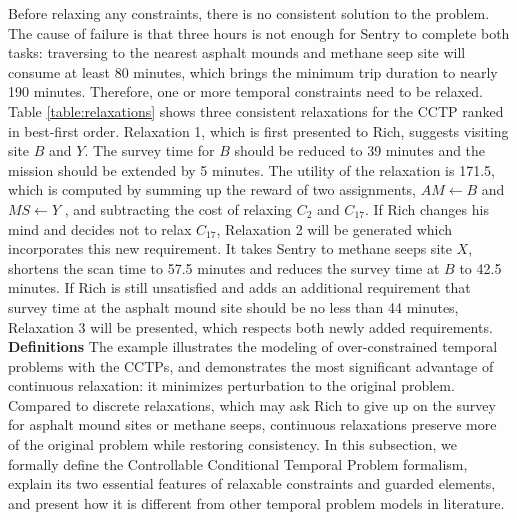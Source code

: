\documentclass[jair,twoside,11pt,theapa]{article}
\begin{document}
Before relaxing any constraints, there is no consistent solution to the problem.
The cause of failure is that three hours is not enough for Sentry to complete
both tasks: traversing to the nearest asphalt mounds and methane seep site
will consume at least 80 minutes, which brings the minimum trip duration to nearly 190
minutes. Therefore, one or more temporal constraints need to be relaxed. Table
\ref{table:relaxations} shows three consistent relaxations for the CCTP ranked
in best-first order. Relaxation 1, which is first presented to Rich, suggests
visiting site $B$ and $Y$. The survey time for $B$ should be reduced to 39
minutes and the mission should be extended by 5 minutes. The utility of the
relaxation is 171.5, which is computed by summing up the reward of two
assignments, $AM \leftarrow B$ and $MS \leftarrow Y$ , and subtracting the cost
of relaxing $C_2$ and $C_{17}$. If Rich changes his mind and decides not to
relax $C_{17}$, Relaxation 2 will be generated which incorporates this new
requirement. It takes Sentry to methane seeps site $X$, shortens the scan time
to 57.5 minutes and reduces the survey time at $B$ to 42.5 minutes. If Rich is still
unsatisfied and adds an additional requirement that survey time at the
asphalt mound site should be no less than 44 minutes, Relaxation 3 will be presented, which respects both newly added requirements.\\



%


\noindent\textbf{Definitions} \indent The example illustrates the
modeling of over-constrained temporal problems with the CCTPs, and demonstrates
the most significant advantage of continuous relaxation: it minimizes
perturbation to the original problem. Compared to discrete relaxations, which
may ask Rich to give up on the survey for asphalt mound sites or methane seeps,
continuous relaxations preserve more of the original problem while restoring
consistency. In this subsection, we formally define the Controllable Conditional
Temporal Problem formalism, explain its two essential features of relaxable
constraints and guarded elements, and present how it is different from other
temporal problem models in literature.
\end{document}
